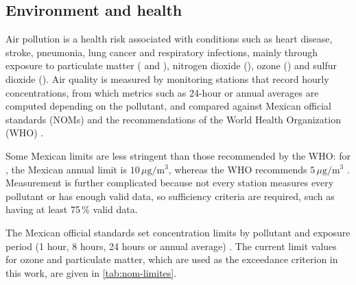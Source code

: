 \subsection{Environment and health}
\label{sec:revi-medio-ambiente}

Air pollution is a health risk associated with conditions such as heart
disease, stroke, pneumonia, lung cancer and respiratory infections, mainly
through exposure to particulate matter ( and ), nitrogen
dioxide (), ozone () and sulfur dioxide (). Air
quality is measured by monitoring stations that record hourly
concentrations, from which metrics such as 24-hour or annual averages are
computed depending on the pollutant, and compared against Mexican official
standards (NOMs) and the recommendations of the World Health Organization
(WHO) \parencite{oms2021}.

Some Mexican limits are less stringent than those recommended by the WHO:
for , the Mexican annual limit is
$10\,\mu\mathrm{g}/\mathrm{m}^{3}$, whereas the WHO recommends
$5\,\mu\mathrm{g}/\mathrm{m}^{3}$ \parencite{oms2021}. Measurement is further
complicated because not every station measures every pollutant or has
enough valid data, so sufficiency criteria are required, such as having at
least 75\,\% valid data.

The Mexican official standards set concentration limits by pollutant and
exposure period (1 hour, 8 hours, 24 hours or annual average)
\parencite{nlAirenlgobmxNormatividad, NOMCalidadAireAmbiente}. The current
limit values for ozone and particulate matter, which are used as the
exceedance criterion in this work, are given in \cref{tab:nom-limites}.
